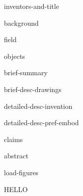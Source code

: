 \documentclass[english]{patentex}
\begin{document}
{inventors-and-title}

\maketitle


{background}

{field}

{objects}

{brief-summary}

{brief-desc-drawings}

{detailed-desc-invention}

{detailed-desc-pref-embod}

{claims}

{abstract}

{load-figures}


HELLO
\end{document}
